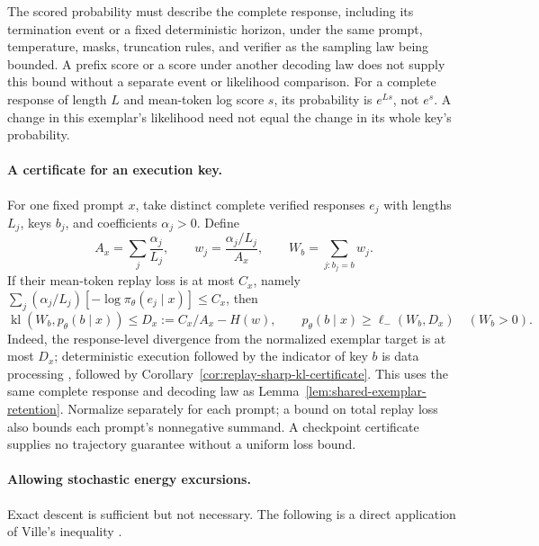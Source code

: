 The scored probability must describe the complete response, including its
termination event or a fixed deterministic horizon, under the same prompt,
temperature, masks, truncation rules, and verifier as the sampling law being
bounded. A prefix score or a score under another decoding law does not
supply this bound without a separate event or likelihood comparison.
For a complete response of length $L$ and mean-token log score $s$, its
probability is $e^{Ls}$, not $e^s$. A change in this exemplar's likelihood
need not equal the change in its whole key's probability.

\paragraph{A certificate for an execution key.}
For one fixed prompt $x$, take distinct complete verified responses $e_j$
with lengths $L_j$, keys $b_j$, and coefficients $\alpha_j>0$. Define
\[
 A_x=\sum_j\frac{\alpha_j}{L_j},\qquad
 w_j=\frac{\alpha_j/L_j}{A_x},\qquad
 W_b=\sum_{j:b_j=b}w_j.
\]
If their mean-token replay loss is at most $C_x$, namely
$\sum_j(\alpha_j/L_j)[-\log\pi_\theta(e_j\mid x)]\le C_x$, then
\begin{equation}
 \operatorname{kl}\!\left(W_b,p_\theta(b\mid x)\right)
 \le D_x:=C_x/A_x-H(w),\qquad
 p_\theta(b\mid x)\ge\ell_-(W_b,D_x)\quad(W_b>0).
 \label{eq:complete-exemplar-key-certificate}
\end{equation}
Indeed, the response-level divergence from the normalized exemplar target is
at most $D_x$; deterministic execution followed by the indicator of key $b$
is data processing \citep[Theorem~9]{vanerven2014renyi}, followed by
Corollary~\ref{cor:replay-sharp-kl-certificate}. This uses the same complete
response and decoding law as Lemma~\ref{lem:shared-exemplar-retention}.
Normalize separately for each prompt; a bound on total replay loss also
bounds each prompt's nonnegative summand. A checkpoint certificate supplies
no trajectory guarantee without a uniform loss bound.

\paragraph{Allowing stochastic energy excursions.}
Exact descent is sufficient but not necessary. The following is a direct
application of Ville's inequality \citep[Lemma~1]{howard2020timeuniform}.

